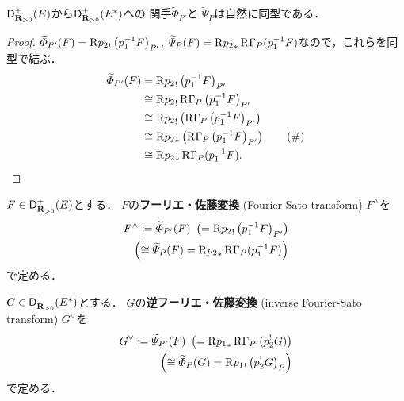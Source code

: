 \begin{THM}[{\cite[Theorem 3.7.7]{KS90}}]
    \(\mathop{\mathsf{D}^{+}_{\mathbf{R}_{>0}}}\nolimits(E)\)から\(\mathop{\mathsf{D}^{+}_{\mathbf{R}_{>0}}}\nolimits(E^\ast)\)への
    関手\(\widetilde{\varPhi}_{P'}\)と
    \(\widetilde{\varPsi}_{P}\)は自然に同型である．
\end{THM}
\begin{proof}
    \(
        \widetilde{\varPhi}_{P'}(F)
        =\mathrm{R}{p_2}_!\left(p_1^{-1}F\right)_{P'}
    \), \(
        \widetilde{\varPsi}_{P}(F)
        =\mathrm{R}{p_2}_{\ast}\mathop{\mathrm{R}\hspace{-0pt}\Gamma}\nolimits_{P}(p_1^{-1}F)
    \)なので，これらを同型で結ぶ．
    \begin{align*}
        \widetilde{\varPhi}_{P'}(F)
        &=\mathrm{R}{p_2}_!\left(p_1^{-1}F\right)_{P'}\\
        &\cong\mathrm{R}{p_2}_!\mathop{\mathrm{R}\hspace{-0pt}\Gamma}\nolimits_{P}\left(p_1^{-1}F\right)_{P'}\\
        &\cong\mathrm{R}{p_2}_!\left(\mathop{\mathrm{R}\hspace{-0pt}\Gamma}\nolimits_{P}\left(p_1^{-1}F\right)_{P'}\right)\\
        &\cong\mathrm{R}{p_2}_{\ast}\left(
            \mathop{\mathrm{R}\hspace{-0pt}\Gamma}\nolimits_{P}\left(p_1^{-1}F\right)_{P'}
        \right)\tag{\(\#\)}\label{377-proper}\\
        &\cong\mathrm{R}{p_2}_{\ast}\mathop{\mathrm{R}\hspace{-0pt}\Gamma}\nolimits_{P}(p_1^{-1}F).
    \end{align*}
\end{proof}
\begin{DFN}[{\cite[Definition 3.7.8]{KS90}}]
    \(F\in\mathop{\mathsf{D}^{+}_{\mathbf{R}_{>0}}}\nolimits(E)\)とする．
    \(F\)の\textbf{フーリエ・佐藤変換} (Fourier-Sato transform) 
    \(F^{\wedge}\)を
    \begin{align*}
        F^{\wedge}
        \coloneqq \widetilde{\varPhi}_{P'}(F)\
        \left(=\mathrm{R}{p_2}_!\left(p_1^{-1}F\right)_{P'}\right)\\
        \left(
            \cong\widetilde{\varPsi}_{P}(F)
            =\mathrm{R}{p_2}_{\ast}\mathop{\mathrm{R}\hspace{-0pt}\Gamma}\nolimits_{P}(p_1^{-1}F)
        \right)
    \end{align*}
    で定める．

    \(G\in\mathop{\mathsf{D}^{+}_{\mathbf{R}_{>0}}}\nolimits(E^\ast)\)とする．
    \(G\)の\textbf{逆フーリエ・佐藤変換} (inverse 
    Fourier-Sato transform) \(G^{\vee}\)を
    \begin{align*}
        G^{\vee}
        \coloneqq \widetilde{\varPsi}_{P'}(F)\
        \left(=\mathrm{R}{p_1}_{\ast}\mathop{\mathrm{R}\hspace{-0pt}\Gamma}\nolimits_{P'}(p_2^{!}G)\right)\\
        \left(
            \cong \widetilde{\varPhi}_{P}(G)
            =\mathrm{R}{p_1}_!\left(p_2^{!}G\right)_{P}
        \right)
    \end{align*}
    で定める．
\end{DFN}

